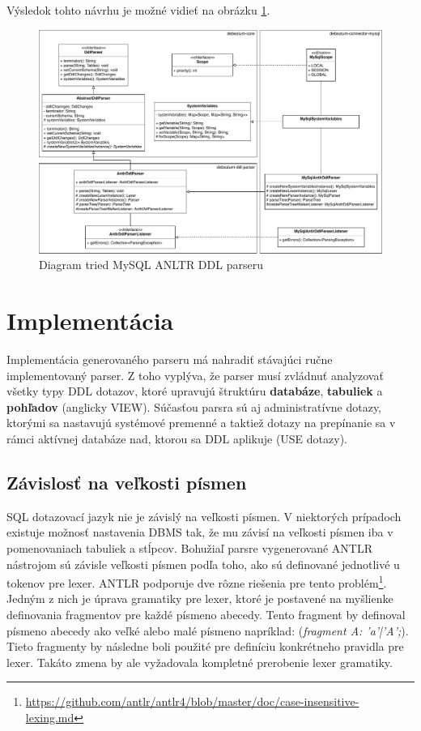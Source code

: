 Výsledok tohto návrhu je možné vidieť na obrázku \ref{fig:class_diagram_antlr}.
\begin{figure}[H]
\begin{center}
\includegraphics[width=15cm]{figures/antlr_design.pdf}
\caption{Diagram tried MySQL ANLTR DDL parseru}
\label{fig:class_diagram_antlr}
\end{center}
\end{figure}

\section{Implementácia}
Implementácia generovaného parseru má nahradiť stávajúci ručne implementovaný parser. Z toho vyplýva, že parser musí zvládnuť analyzovať všetky typy DDL dotazov, ktoré upravujú štruktúru \textbf{databáze}, \textbf{tabuliek} a \textbf{pohľadov} (anglicky VIEW). Súčasťou parsra sú aj administratívne dotazy, ktorými sa nastavujú systémové premenné a taktiež dotazy na prepínanie sa v rámci aktívnej databáze nad, ktorou sa DDL aplikuje (USE dotazy).

\subsection{Závislosť na veľkosti písmen}
SQL dotazovací jazyk nie je závislý na veľkosti písmen. V niektorých prípadoch existuje možnosť nastavenia DBMS tak, že mu závisí na veľkosti písmen iba v pomenovaniach tabuliek a stĺpcov. Bohužiaľ parsre vygenerované ANTLR nástrojom sú závisle veľkosti písmen podľa toho, ako sú definované jednotlivé u tokenov pre lexer. ANTLR podporuje dve rôzne riešenia pre tento problém\footnote{\url{https://github.com/antlr/antlr4/blob/master/doc/case-insensitive-lexing.md}}. Jedným z nich je úprava gramatiky pre lexer, ktoré je postavené na myšlienke definovania fragmentov pre každé písmeno abecedy. Tento fragment by definoval písmeno abecedy ako veľké alebo malé písmeno napríklad: (\textit{fragment A: 'a'|'A';}). Tieto fragmenty by následne boli použité pre definíciu konkrétneho pravidla pre lexer. Takáto zmena by ale vyžadovala kompletné prerobenie lexer gramatiky.

